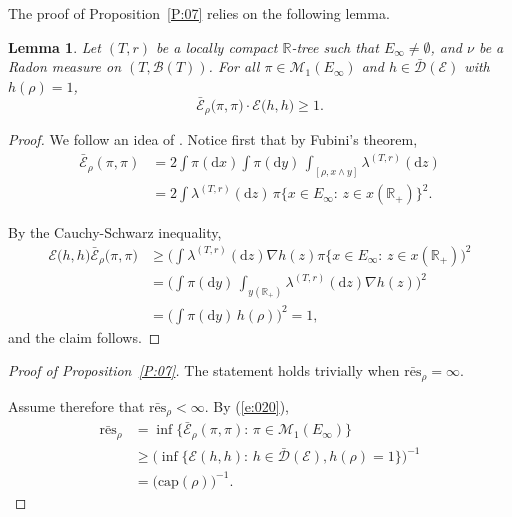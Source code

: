 \documentclass[11pt]{amsart}
\numberwithin{equation}{section}
\newtheorem{lemma}[definition]{Lemma}
\begin{document}
{The proof of Proposition~\ref{P:07} relies on the following lemma.
\begin{lemma}
Let $(T,r)$ be a locally compact ${{\mathbb R}}$-tree
such that $E_\infty \not = \emptyset$, { and $\nu$ be a Radon measure on $(T,{\mathcal B}(T))$.}
\label{L:07}
{For all $\pi\in{\mathcal M}_1(E_\infty)$ and  $h\in\bar{\mathcal D}({\mathcal E})$ with $h(\rho)=1$, }
\begin{equation}\label{e:020}
  \bar{\mathcal E}_\rho\big(\pi,\pi\big)\cdot {\mathcal E}\big(h,h\big)\ge 1.
\end{equation}
\end{lemma}{\smallskip}

\begin{proof}  We follow an idea of \cite{Lyo90}.
Notice first that by Fubini's theorem,
\begin{equation}\label{e:022}
\begin{aligned}
   \bar{\mathcal E}_\rho(\pi,\pi)
 &=
   2\int\pi(\mathrm{d}x)\int\pi(\mathrm{d}y)\,
   \int_{[\rho,x\wedge y]}\lambda^{(T,r)}(\mathrm{d}z)
  \\
 &=
   2\int\lambda^{(T,r)}(\mathrm{d}z)\,\pi\big\{x\in E_\infty:\,{z\in x({{\mathbb R}}_+)}\big\}^2.
\end{aligned}
\end{equation}

By the Cauchy-Schwarz inequality,
\begin{equation}\label{e:021}
\begin{aligned}
   {\mathcal E}\big(h,h\big)\bar{\mathcal E}_\rho\big(\pi,\pi\big)
 &\ge
   \Big(\int\lambda^{(T,r)}(\mathrm{d}z)\nabla h(z)
   \pi\{x\in E_\infty:\,{z\in x({{\mathbb R}}_+)}\Big)^2
  \\
 &=
   \Big(\int\pi(\mathrm{d}y)\,\int_{{y({{\mathbb R}}_+)}}\lambda^{(T,r)}(\mathrm{d}z)\nabla
   h(z)\Big)^2
  \\
 &=
   \big(\int\pi(\mathrm{d}y)\, h(\rho) \big)^2 = 1,
\end{aligned}
\end{equation}
and the claim follows.
\end{proof}{\smallskip}

\begin{proof}[Proof of Proposition~\ref{P:07}]
The statement holds trivially when  $ \bar{\mathrm{res}}_{\rho}=\infty$.

Assume therefore that  $\bar{\mathrm{res}}_{\rho}<\infty$. By (\ref{e:020}),
\begin{equation}
\label{e:proofres}
\begin{aligned}
   \bar{\mathrm{res}}_{\rho}
 &=\inf\big\{\bar{{\mathcal E}}_\rho(\pi,\pi):\,\pi\in{\mathcal M}_1(E_\infty)\big\}
  \\
 &\ge
   \big(\inf\{{\mathcal E}(h,h):\,h\in\bar{{\mathcal D}}({\mathcal E}),h(\rho)=1\}\big)^{-1}
  \\
 &=\big(\mathrm{cap}({\rho})\big)^{-1}.
\end{aligned}
\end{equation}
\end{proof}{\smallskip}

}
\end{document}
